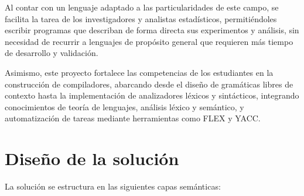 \documentclass{article}
\begin{document}
Al contar con un lenguaje adaptado a las particularidades de este campo, se facilita la tarea de los investigadores y analistas estadísticos, permitiéndoles escribir programas que describan de forma directa sus experimentos y análisis, sin necesidad de recurrir a lenguajes de propósito general que requieren más tiempo de desarrollo y validación.

Asimismo, este proyecto fortalece las competencias de los estudiantes en la construcción de compiladores, abarcando desde el diseño de gramáticas libres de contexto hasta la implementación de analizadores léxicos y sintácticos, integrando conocimientos de teoría de lenguajes, análisis léxico y semántico, y automatización de tareas mediante herramientas como FLEX y YACC.


\section{Diseño de la solución}\label{sec:dis}

La solución se estructura en las siguientes capas semánticas:
\end{document}
